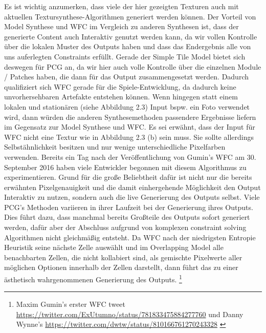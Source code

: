 \documentclass[12pt, a4paper,twoside,openright]{report} %
\begin{document}
Es ist wichtig anzumerken, dass viele der hier gezeigten Texturen auch mit aktuellen Textursynthese-Algorithmen generiert werden können.
Der Vorteil von Model Synthese und WFC im Vergleich zu anderen Synthesen ist, dass der generierte Content auch Interaktiv genutzt werden kann,
da wir vollen Kontrolle über die lokalen Muster des Outputs haben und dass das Endergebnis alle von uns auferlegten Constraints erfüllt.
Gerade der Simple Tile Model bietet sich deswegen für PCG an, da wir hier auch volle Kontrolle über die einzelnen Module / Patches haben,
die dann für das Output zusammengesetzt werden.
Dadurch qualifiziert sich WFC gerade für die Spiele-Entwicklung, da dadurch keine unvorhersehbaren Artefakte entstehen können.
Wenn hingegen statt einem lokalen und stationären {(siehe Abbildung 2.3)} Input bspw. ein Foto verwendet wird,
dann würden die anderen Synthesemethoden passendere Ergebnisse liefern im Gegensatz zur Model Synthese und WFC.
Es sei erwähnt, dass der Input für WFC nicht  eine Textur wie in Abbildung 2.3 {(b)} sein muss.
Sie sollte allerdings Selbstähnlichkeit besitzen und nur wenige unterschiedliche Pixelfarben verwenden.
\newline
Bereits ein Tag nach der Veröffentlichung von Gumin's WFC am 30. September 2016 haben viele Entwickler begonnen mit diesem Algorithmus zu experimentieren.
Grund für die große Beliebtheit dafür ist nicht nur die bereits erwähnten Pixelgenauigkeit und die damit einhergehende Möglichkeit den Output Interaktiv zu nutzen,
sondern auch die live Generierung des Outputs selbst.
Viele PCG's Methoden variieren in ihrer Laufzeit bei der Generierung ihres Outputs.
Dies führt dazu, dass manchmal bereits Großteile des Outputs sofort generiert werden,
dafür aber der Abschluss aufgrund von komplexen constraint solving Algorithmen nicht gleichmäßig entsteht. \cite{Karth2017WaveFunctionCollapseIC}
Da WFC nach der niedrigsten Entropie Heuristik seine nächste Zelle auswählt und im Overlapping Model alle benachbarten Zellen, die nicht kollabiert sind,
als gemischte Pixelwerte aller möglichen Optionen innerhalb der Zellen darstellt, dann führt das zu einer ästhetisch wahrgenommenen Generierung des Outputs.
\footnote[4]{Maxim Gumin’s erster WFC tweet 
\newline
\url{https://twitter.com/ExUtumno/status/781833475884277760}
\newline
und Danny Wynne’s 
\newline
\url{https://twitter.com/dwtw/status/810166761270243328} \cite{Karth2017WaveFunctionCollapseIC}}
\end{document}
